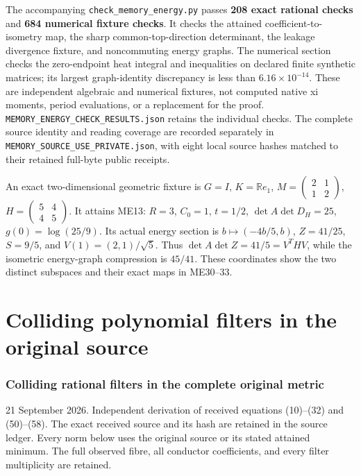 \documentclass[11pt]{article}
\begin{document}
The accompanying \nolinkurl{check_memory_energy.py} passes \textbf{208 exact rational checks} and \textbf{684 numerical fixture checks}. It checks the attained coefficient-to-isometry map, the sharp common-top-direction determinant, the leakage divergence fixture, and noncommuting energy graphs. The numerical section checks the zero-endpoint heat integral and inequalities on declared finite synthetic matrices; its largest graph-identity discrepancy is less than \(6.16\times10^{-14}\). These are independent algebraic and numerical fixtures, not computed native xi moments, period evaluations, or a replacement for the proof. \nolinkurl{MEMORY_ENERGY_CHECK_RESULTS.json} retains the individual checks. The complete source identity and reading coverage are recorded separately in \nolinkurl{MEMORY_SOURCE_USE_PRIVATE.json}, with eight local source hashes matched to their retained full-byte public receipts.

An exact two-dimensional geometric fixture is \(G=I\), \(K=\mathbb Re_1\), \(M=\left(\begin{smallmatrix}2&1\\1&2\end{smallmatrix}\right)\), \(H=\left(\begin{smallmatrix}5&4\\4&5\end{smallmatrix}\right)\). It attains ME13: \(R=3\), \(C_0=1\), \(t=1/2\), \(\det A\det D_H=25\), \(g(0)=\log(25/9)\). Its actual energy section is \(b\mapsto(-4b/5,b)\), \(Z=41/25\), \(S=9/5\), and \(V(1)=(2,1)/\sqrt5\). Thus \(\det A\det Z=41/5=V^THV\), while the isometric energy-graph compression is \(45/41\). These coordinates show the two distinct subspaces and their exact maps in ME30--33.


\clearpage\part{Colliding polynomial filters in the original source}
\section{Colliding rational filters in the complete original metric}\label{colliding-rational-filters-in-the-complete-original-metric}

21 September 2026. Independent derivation of received equations (10)--(32) and (50)--(58). The exact received source and its hash are retained in the source ledger. Every norm below uses the original source or its stated attained minimum. The full observed fibre, all conductor coefficients, and every filter multiplicity are retained.
\end{document}
